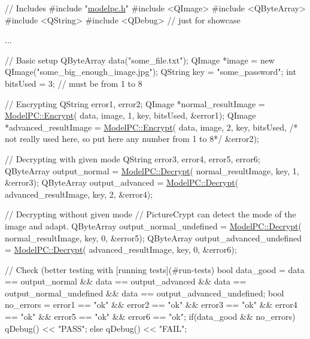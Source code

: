 \begin{DoxyCode}
\textcolor{comment}{// Includes}
\textcolor{preprocessor}{#include "\hyperlink{modelpc_8h}{modelpc.h}"}
\textcolor{preprocessor}{#include <QImage>}
\textcolor{preprocessor}{#include <QByteArray>}
\textcolor{preprocessor}{#include <QString>}
\textcolor{preprocessor}{#include <QDebug>} \textcolor{comment}{// just for showcase}

...

\textcolor{comment}{// Basic setup}
QByteArray data(\textcolor{stringliteral}{"some\_file.txt"});
QImage *image = \textcolor{keyword}{new} QImage(\textcolor{stringliteral}{"some\_big\_enough\_image.jpg"});
QString key = \textcolor{stringliteral}{"some\_password"};
\textcolor{keywordtype}{int} bitsUsed = 3; \textcolor{comment}{// must be from 1 to 8}

\textcolor{comment}{// Encrypting}
QString error1, error2;
QImage *normal\_resultImage = \hyperlink{class_model_p_c_a271cf9285e32df58ffbfc918e6482bbd}{ModelPC::Encrypt}(
        data,
        image,
        1,
        key,
        bitsUsed,
        &error1);
QImage *advanced\_resultImage = \hyperlink{class_model_p_c_a271cf9285e32df58ffbfc918e6482bbd}{ModelPC::Encrypt}(
        data,
        image,
        2, key,
        bitsUsed, \textcolor{comment}{/* not really used here, so put here any number from 1 to 8*/}
        &error2);

\textcolor{comment}{// Decrypting with given mode}
QString error3, error4, error5, error6;
QByteArray output\_normal = \hyperlink{class_model_p_c_a902abaea4f07995b48c0f2fea6eceb7c}{ModelPC::Decrypt}(
        normal\_resultImage,
        key,
        1,
        &error3);
QByteArray output\_advanced = \hyperlink{class_model_p_c_a902abaea4f07995b48c0f2fea6eceb7c}{ModelPC::Decrypt}(
        advanced\_resultImage,
        key,
        2,
        &error4);

\textcolor{comment}{// Decrypting without given mode}
\textcolor{comment}{// PictureCrypt can detect the mode of the image and adapt.}
QByteArray output\_normal\_undefined = \hyperlink{class_model_p_c_a902abaea4f07995b48c0f2fea6eceb7c}{ModelPC::Decrypt}(
        normal\_resultImage,
        key,
        0,
        &error5);
QByteArray output\_advanced\_undefined = \hyperlink{class_model_p_c_a902abaea4f07995b48c0f2fea6eceb7c}{ModelPC::Decrypt}(
        advanced\_resultImage,
        key,
        0,
        &error6);

\textcolor{comment}{// Check (better testing with [running tests](#run-tests)}
\textcolor{keywordtype}{bool} data\_good =
        data == output\_normal &&
        data == output\_advanced &&
        data == output\_normal\_undefined &&
        data == output\_advanced\_undefined;
\textcolor{keywordtype}{bool} no\_errors =
        error1 == \textcolor{stringliteral}{"ok"} &&
        error2 == \textcolor{stringliteral}{"ok"} &&
        error3 == \textcolor{stringliteral}{"ok"} &&
        error4 == \textcolor{stringliteral}{"ok"} &&
        error5 == \textcolor{stringliteral}{"ok"} &&
        error6 == \textcolor{stringliteral}{"ok"};
\textcolor{keywordflow}{if}(data\_good && no\_errors)
    qDebug() << \textcolor{stringliteral}{"PASS"};
\textcolor{keywordflow}{else}
    qDebug() << \textcolor{stringliteral}{"FAIL"};
\end{DoxyCode}
